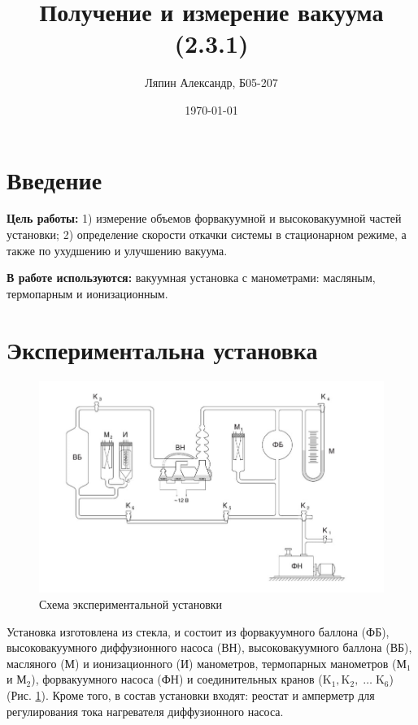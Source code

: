\documentclass[a4paper,12pt]{article}
\title{Получение и измерение вакуума (2.3.1)}
\author{Ляпин Александр, Б05-207}
\date{\today}
\theoremstyle{definition}
\begin{document}
	\maketitle
	
	\section{Введение}
	\noindent\textbf{Цель работы:} 1) измерение объемов форвакуумной и высоковакуумной частей установки; 2) определение скорости откачки системы в стационарном режиме, а также по ухудшению и улучшению вакуума.\\
	\bigskip
	
	\noindent\textbf{В работе используются:} вакуумная установка с манометрами: масляным, термопарным и ионизационным.
	
	\section{Экспериментальна установка}
	
	\begin{figure}[h!]
		\centering
		\includegraphics[scale=0.53]{facility.jpg}
		\caption{Схема экспериментальной установки}
		\label{facility}
	\end{figure}
	
	Установка изготовлена из стекла,
	и состоит из форвакуумного баллона (ФБ), высоковакуумного диффузионного насоса (ВН), высоковакуумного баллона (ВБ), масляного (М) и ионизационного (И) манометров, термопарных манометров ($\text{М}_1$ и $\text{М}_2$), форвакуумного насоса (ФН) и соединительных кранов ($\text{K}_1, \text{K}_2,\; \ldots \;\text{K}_6$) (Рис. \ref{facility}). Кроме того, в состав установки входят: реостат и амперметр для регулирования тока нагревателя диффузионного насоса.
	
\end{document}
